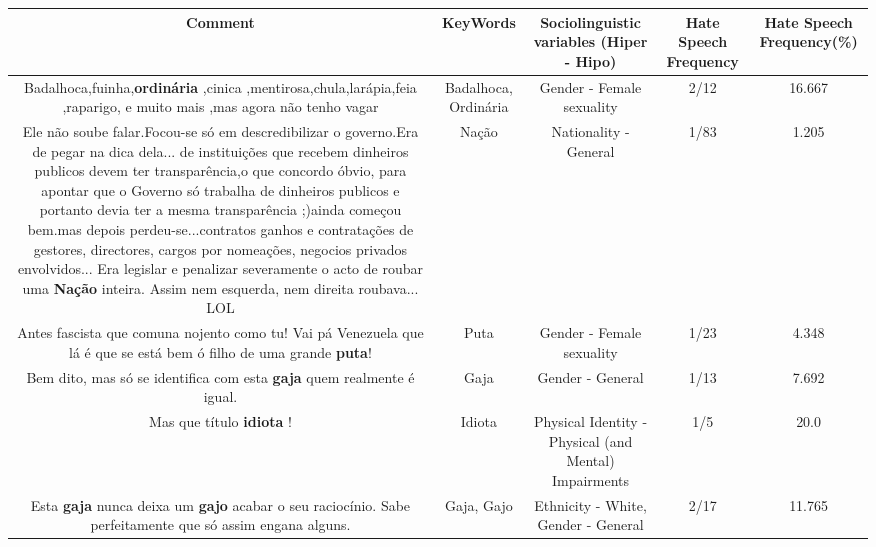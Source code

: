 \documentclass[11pt]{article}
\newlength\mylength
\begin{document}
\begin{center}
\setlength\mylength{\dimexpr\textwidth - 1\arrayrulewidth - 50\tabcolsep}
\begin{longtable}{|C{.65\mylength}|C{.30\mylength}|C{.12\mylength}|C{.12\mylength}|C{.12\mylength}|}
\hline
\textbf{Comment} & \textbf{KeyWords} & \textbf{Sociolinguistic variables (Hiper - Hipo)}  & \textbf{Hate Speech Frequency} & \textbf{Hate Speech Frequency(\%)} \\
\hline{}\small Badalhoca,fuinha,\textbf{ordinária} ,cinica ,mentirosa,chula,larápia,feia ,raparigo, e muito mais ,mas agora não tenho vagar\normalsize   & Badalhoca, Ordinária & Gender - Female sexuality & 2/12 & 16.667 \\  \hline
  \small Ele não soube falar.Focou-se só em descredibilizar o governo.Era de pegar na dica dela...  de instituições que recebem dinheiros publicos devem ter transparência,o que concordo óbvio, para apontar que o Governo só trabalha de dinheiros publicos e portanto devia ter a mesma transparência ;)ainda começou bem.mas depois perdeu-se...contratos ganhos e contratações de gestores, directores, cargos por nomeações, negocios privados envolvidos... Era legislar e penalizar severamente o acto de roubar uma \textbf{Nação} inteira. Assim nem esquerda, nem direita roubava... LOL\normalsize   & Nação & Nationality - General & 1/83 & 1.205 \\  \hline
  \small Antes fascista que comuna nojento como tu! Vai pá Venezuela que lá é que se está bem ó filho de uma grande \textbf{puta}!\normalsize   & Puta & Gender - Female sexuality & 1/23 & 4.348 \\  \hline
  \small Bem dito, mas só se identifica com esta \textbf{gaja} quem realmente é igual.\normalsize   & Gaja & Gender - General & 1/13 & 7.692 \\  \hline
  \small Mas que título \textbf{idiota} !\normalsize   & Idiota & Physical Identity - Physical (and Mental) Impairments & 1/5 & 20.0 \\  \hline
  \small Esta \textbf{gaja} nunca deixa um \textbf{gajo} acabar o seu raciocínio.  Sabe perfeitamente que só assim engana alguns.\normalsize   & Gaja, Gajo & Ethnicity - White, Gender - General & 2/17 & 11.765 \\  \hline

\end{longtable}
\end{center}
\end{document}
